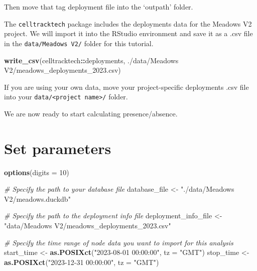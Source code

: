 \documentclass[
]{book}
\newenvironment{Shaded}{\begin{snugshade}}{\end{snugshade}}
\newcommand{\AttributeTok}[1]{\textcolor[rgb]{0.13,0.29,0.53}{#1}}
\newcommand{\CommentTok}[1]{\textcolor[rgb]{0.56,0.35,0.01}{\textit{#1}}}
\newcommand{\DecValTok}[1]{\textcolor[rgb]{0.00,0.00,0.81}{#1}}
\newcommand{\FunctionTok}[1]{\textcolor[rgb]{0.13,0.29,0.53}{\textbf{#1}}}
\newcommand{\NormalTok}[1]{#1}
\newcommand{\OtherTok}[1]{\textcolor[rgb]{0.56,0.35,0.01}{#1}}
\newcommand{\SpecialCharTok}[1]{\textcolor[rgb]{0.81,0.36,0.00}{\textbf{#1}}}
\newcommand{\StringTok}[1]{\textcolor[rgb]{0.31,0.60,0.02}{#1}}
\begin{document}
Then move that tag deployment file into the `outpath' folder.

The \texttt{celltracktech} package includes the deployments data for the Meadows V2 project. We will import it into the RStudio environment and save it as a .csv file in the \texttt{data/Meadows\ V2/} folder for this tutorial.

\begin{Shaded}
\begin{Highlighting}[]
\FunctionTok{write\_csv}\NormalTok{(celltracktech}\SpecialCharTok{::}\NormalTok{deployments, }\StringTok{\textquotesingle{}./data/Meadows V2/meadows\_deployments\_2023.csv\textquotesingle{}}\NormalTok{)}
\end{Highlighting}
\end{Shaded}

If you are using your own data, move your project-specific deployments .csv file into your \texttt{data/\textless{}project\ name\textgreater{}/} folder.

We are now ready to start calculating presence/absence.

\section{Set parameters}\label{set-parameters}

\begin{Shaded}
\begin{Highlighting}[]
\FunctionTok{options}\NormalTok{(}\AttributeTok{digits =} \DecValTok{10}\NormalTok{)}

\CommentTok{\# Specify the path to your database file}
\NormalTok{database\_file }\OtherTok{\textless{}{-}} \StringTok{"./data/Meadows V2/meadows.duckdb"}

\CommentTok{\# Specify the path to the deployment info file}
\NormalTok{deployment\_info\_file }\OtherTok{\textless{}{-}} \StringTok{"data/Meadows V2/meadows\_deployments\_2023.csv"}

\CommentTok{\# Specify the time range of node data you want to import for this analysis}
\NormalTok{start\_time }\OtherTok{\textless{}{-}} \FunctionTok{as.POSIXct}\NormalTok{(}\StringTok{"2023{-}08{-}01 00:00:00"}\NormalTok{, }\AttributeTok{tz =} \StringTok{"GMT"}\NormalTok{)}
\NormalTok{stop\_time }\OtherTok{\textless{}{-}} \FunctionTok{as.POSIXct}\NormalTok{(}\StringTok{"2023{-}12{-}31 00:00:00"}\NormalTok{, }\AttributeTok{tz =} \StringTok{"GMT"}\NormalTok{)}
\end{Highlighting}
\end{Shaded}
\end{document}
